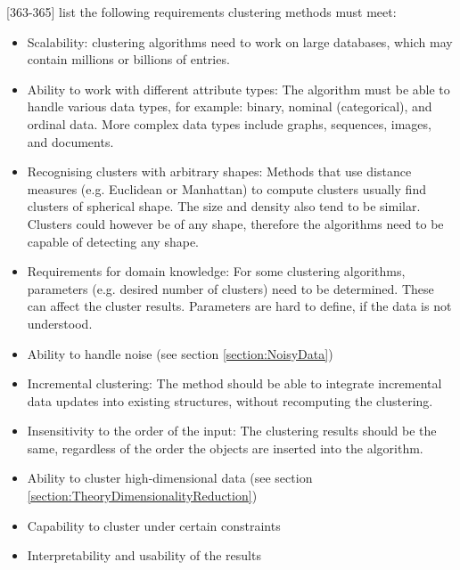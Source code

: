 




\textcite{han2011data}[363-365] list the following requirements  clustering methods must meet:
\begin{itemize}
  \item Scalability: clustering algorithms need to work on large databases, which may contain millions or billions of entries.
  \item Ability to work with different attribute types: The algorithm must be able to handle various data types, for example: binary, nominal (categorical), and ordinal data. More complex data types include graphs, sequences, images, and documents.
  \item Recognising clusters with arbitrary shapes: Methods that use distance measures (e.g. Euclidean or Manhattan) to compute clusters usually find clusters of spherical shape. The size and density also tend to be similar. Clusters could however be of any shape, therefore the algorithms need to be capable of detecting any shape.
  \item Requirements for domain knowledge: For some clustering algorithms, parameters (e.g. desired number of clusters) need to be determined. These can affect the cluster results. Parameters are hard to define, if the data is not understood.
  \item Ability to handle noise (see section \ref{section:NoisyData})
  \item Incremental clustering: The method should be able to integrate incremental data updates into existing structures, without recomputing the clustering.
  \item Insensitivity to the order of the input: The clustering results should be the same, regardless of the order the objects are inserted into the algorithm.
  \item Ability to cluster high-dimensional data (see section \ref{section:TheoryDimensionalityReduction}) %
  \item Capability to cluster under certain constraints %
  \item Interpretability and usability of the results
\end{itemize}

